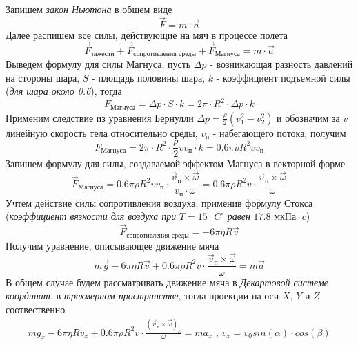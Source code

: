 \documentclass[a5paper, 10pt]{article}
\theoremstyle{definition}
\theoremstyle{plain}
\theoremstyle{remark}
\begin{document}
Запишем \textit{закон Ньютона} в общем виде
\begin{equation}
\vec{F} = m \cdot \vec{a}
\end{equation}
Далее распишем все силы, действующие на мяч в процессе полета
\begin{equation}
\vec{F}_{\text{тяжести}}+ \vec{F}_{\text{сопротивления среды}} + \vec{F}_{\text{Магнуса}}= m \cdot \vec{a}
\end{equation}
Выведем формулу для силы Магнуса, пусть $\Delta p $ - возникающая разность давлений на стороны шара, $S$ - площадь половины шара,  $k$ - коэффициент подъемной силы (\textit{для шара около 0.6}), тогда
\begin{equation}
F_{\text{Магнуса}}= \Delta p \cdot S\cdot k = 2 \pi \cdot R^{2} \cdot \Delta p \cdot k
\end{equation}
Применим следствие из уравнения Бернулли $\Delta p = \frac{\rho}{2} \left( v^{2}_{1}- v^{2}_{2} \right)$ и обозначим за $v$ линейную скорость тела относительно среды, $v_{\text{п}}$ - набегающего потока, получим
\begin{equation}
F_{\text{Магнуса}}= 2 \pi \cdot R^{2} \cdot \frac{\rho}{2} v v_{\text{п}} \cdot k = 0.6 \pi \rho  R^{2}  v v_{\text{п}}
\end{equation}
Запишем формулу для силы, создаваемой эффектом Магнуса в векторной форме
\begin{equation}
\vec{F}_{\text{Магнуса}}= 0.6 \pi \rho  R^{2} v v_{\text{п}} \cdot  \frac{   \vec{v}_{\text{п}} \times \vec{\omega}}{ v_{\text{п}} \cdot \omega} = 0.6 \pi \rho  R^{2} v  \cdot  \frac{   \vec{v}_{\text{п}} \times \vec{\omega}}{  \omega}
\end{equation}
Учтем действие силы сопротивления воздуха, применив формулу Стокса (\textit{коэффициент вязкости для воздуха при } $ T = 15 \text{ }C^{\circ} $ \textit{равен} $17.8 \textit{ мкПа}\cdot c $)
\begin{equation}
\vec{F}_{\text{сопротивления среды}} = - 6 \pi  \eta R \vec{v}
\end{equation}
Получим уравнение, описывающее движение мяча
\begin{equation}
m \vec{g} - 6 \pi  \eta R \vec{v} +0.6 \pi \rho  R^{2} v  \cdot  \frac{   \vec{v}_{\text{п}} \times \vec{\omega}}{  \omega} = m \vec{a}
\end{equation}
В общем случае будем рассматривать движение мяча в \textit{Декартовой системе координат}, в \textit{трехмерном пространстве}, тогда проекции на оси $X$, $Y$ и $Z$ соотвественно
\begin{multline}
m g_{x} - 6 \pi  \eta R v_{x} +0.6 \pi \rho  R^{2} v  \cdot  \frac{  \left( \vec{v}_{\text{п}} \times \vec{\omega} \right)_{x}}{  \omega} = m a_{x} \text{ , } v_{x} = v_0 sin \left( \alpha \right) \cdot cos  \left( \beta \right)
\end{multline}
\end{document}

